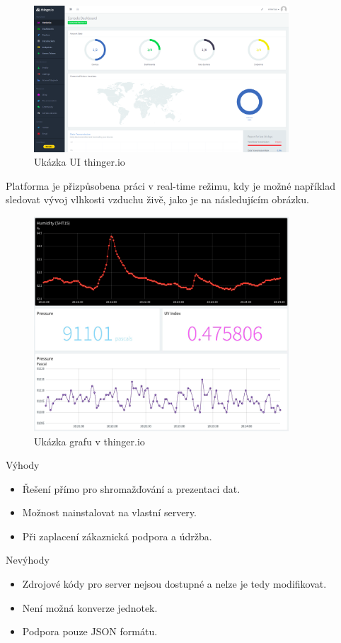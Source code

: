 \documentclass[thesis=M,czech]{FITthesis}[2018/10/20]
\begin{document}
\newpage

\begin{figure}[H]
\caption{Ukázka UI thinger.io}
\centering
\includegraphics[width=0.85\textwidth]{thinger}
\end{figure}

Platforma je přizpůsobena práci v real-time režimu, kdy je možné například sledovat vývoj vlhkosti vzduchu živě, jako je na následujícím obrázku.
\begin{figure}[H]
\caption{Ukázka grafu v thinger.io}
\centering
\includegraphics[width=0.85\textwidth]{real-time-iot-dashboards}
\end{figure}

\bigbreak
\newpage
Výhody
\begin{itemize}
 \item Řešení přímo pro shromažďování a prezentaci dat.
 \item Možnost nainstalovat na vlastní servery.
 \item Při zaplacení zákaznická podpora a údržba.
\end{itemize}
\bigbreak
Nevýhody
\begin{itemize}
 \item Zdrojové kódy pro server nejsou dostupné a nelze je tedy modifikovat.
 \item Není možná konverze jednotek.
 \item Podpora pouze JSON formátu.
\end{itemize}
\end{document}
